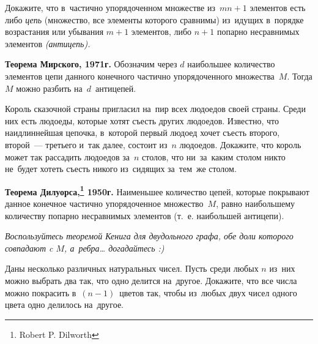 \begin{problems}

\item
Докажите, что в~частично упорядоченном множестве из~$m n + 1$ элементов есть
либо \emph{цепь} (множество, все элементы которого сравнимы) из~идущих
в~порядке возрастания или убывания $m + 1$ элементов, либо $n + 1$ попарно
несравнимых элементов \emph{(антицепь).}

\item\textbf{Теорема Мирского, 1971г.}
Обозначим через $d$ наибольшее количество элементов цепи данного конечного
частично упорядоченного множества~$M$.
Тогда $M$ можно разбить на~$d$~антицепей.

\item
Король сказочной страны пригласил на~пир всех людоедов своей страны.
Среди них есть людоеды, которые хотят съесть других людоедов.
Известно, что наидлиннейшая цепочка, в~которой первый людоед хочет съесть
второго, второй~--- третьего и~так далее, состоит из~$n$ людоедов.
Докажите, что король может так рассадить людоедов за~$n$ столов, что ни~за~каким столом никто не~будет хотеть съесть никого из~сидящих за~тем~же столом.

\item\textbf{%
Теорема Дилуорса,\footnote{Robert P. Dilworth}
1950г.}
Наименьшее количество цепей, которые покрывают данное конечное частично
упорядоченное множество~$M$, равно наибольшему количеству попарно несравнимых
элементов (т.~е. наибольшей антицепи).
\par
\emph{Воспользуйтесь теоремой Кенига для двудольного графа, обе доли которого
совпадают c $M$, а~ребра\ldots{} догадайтесь :)}

\item
Даны несколько различных натуральных чисел.
Пусть среди любых $n$ из~них можно выбрать два так, что одно делится на~другое.
Докажите, что все числа можно покрасить в~$(n - 1)$~цветов так, чтобы из~любых
двух чисел одного цвета одно делилось на~другое.

\end{problems}

